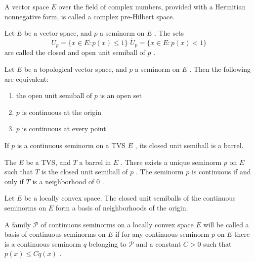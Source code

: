 \begin{defn}
	A vector space $ E $ over the field of complex numbers, provided with a Hermitian nonnegative form,  is called a complex pre-Hilbert space.
\end{defn}

\begin{defn}
	Let $ E $ be a vector space, and $ p $ a seminorm on $ E $ . The sets
	\[
		U_{ p } = \{ x \in E : p(x) \leq 1 \} \hspace{4pt} \dot{U}_{ p } = \{ x \in E: p(x) < 1 \}
	\]
	are called the closed and open unit semiball of $ p $ .
\end{defn}

\begin{prop}
	Let $ E $ be a topological vector space, and $ p $ a seminorm on $ E $ . Then the following are equivalent:
	\begin{enumerate}
		\item the open unit semiball of $ p $ is an open set
		\item $ p $ is continuous at the origin
		\item $ p $ is continuous at every point
	\end{enumerate}
	
\end{prop}

\begin{prop}
	If $ p $ is a continuous seminorm on a TVS $ E $ , its closed unit semiball is a barrel.
\end{prop}

\begin{prop}
	The $ E $ be a TVS, and $ T $ a barrel in $ E $ . There exists a unique seminorm $ p $ on $ E $ such that $ T $ is the closed unit semiball of $ p $ . The seminorm $ p $ is continuous if and only if $ T $ is a neighborhood of $ 0 $ .
\end{prop}

\begin{cor}
	Let $ E $ be a locally convex space. The closed unit semiballs of the continuous seminorms on $ E $ form a basis of neighborhoods of the origin.
\end{cor}

\begin{defn}
	A family $ \mathcal{P} $  of continuous seminorms on a locally convex space $ E $ will be called a basis of continuous seminorms on $ E $ if for any continuous seminorm $ p $ on $ E $ there is a continuous seminorm $ q $ belonging to $ \mathcal{P} $ and a constant $ C > 0 $ such that $ p(x) \leq C q(x) $ .
\end{defn}

